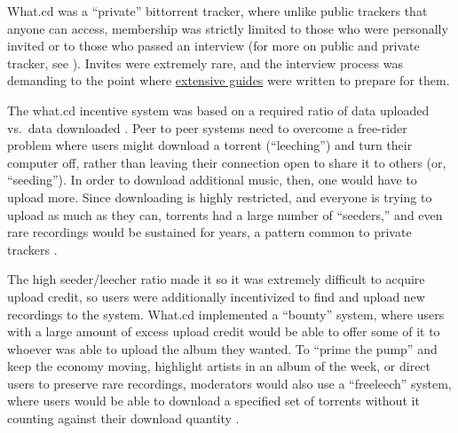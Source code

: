\documentclass[10pt]{tufte-book}
\begin{document}
What.cd was a ``private'' bittorrent tracker, where unlike public
trackers that anyone can access, membership was strictly limited to
those who were personally invited or to those who passed an interview
(for more on public and private tracker, see \citep{meulpolderPublicPrivateBitTorrent} ). Invites were extremely rare,
and the interview process was demanding to the point where
\href{https://opentrackers.org/whatinterviewprep.com/index.html}{extensive
guides} were written to prepare for them.

The what.cd incentive system was based on a required ratio of data
uploaded vs.~data downloaded \citep{jiaHowSurviveThrive2013} .
Peer to peer systems need to overcome a free-rider problem where users
might download a torrent (``leeching'') and turn their computer off,
rather than leaving their connection open to share it to others (or,
``seeding''). In order to download additional music, then, one would
have to upload more. Since downloading is highly restricted, and
everyone is trying to upload as much as they can, torrents had a large
number of ``seeders,'' and even rare recordings would be sustained for
years, a pattern common to private trackers \citep{liuUnderstandingImprovingRatio2010} .

The high seeder/leecher ratio made it so it was extremely difficult to
acquire upload credit, so users were additionally incentivized to find
and upload new recordings to the system. What.cd implemented a
``bounty'' system, where users with a large amount of excess upload
credit would be able to offer some of it to whoever was able to upload
the album they wanted. To ``prime the pump'' and keep the economy
moving, highlight artists in an album of the week, or direct users to
preserve rare recordings, moderators would also use a ``freeleech''
system, where users would be able to download a specified set of
torrents without it counting against their download quantity \citep{kashEconomicsBitTorrentCommunities2012, chenImprovingSustainabilityPrivate2011a} .
\end{document}
